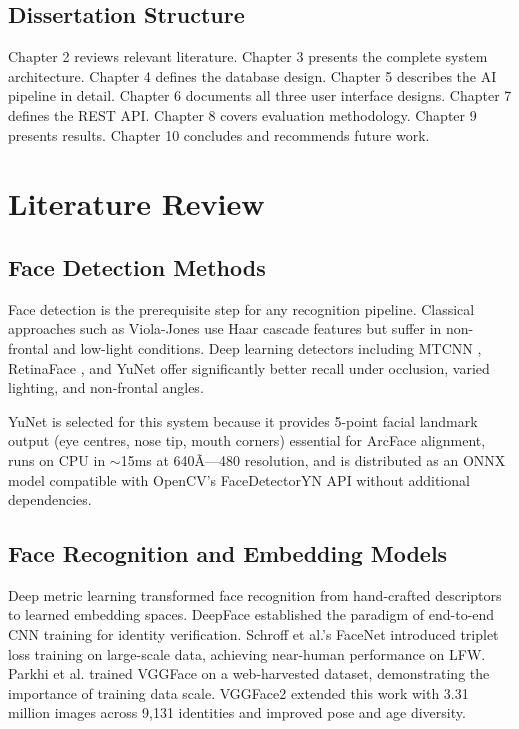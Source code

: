 \documentclass[12pt,a4paper]{report}
\begin{document}
\section{Dissertation Structure}
Chapter 2 reviews relevant literature. Chapter 3 presents the complete system architecture. Chapter 4 defines the database design. Chapter 5 describes the AI pipeline in detail. Chapter 6 documents all three user interface designs. Chapter 7 defines the REST API. Chapter 8 covers evaluation methodology. Chapter 9 presents results. Chapter 10 concludes and recommends future work.

\chapter{Literature Review}

\section{Face Detection Methods}
Face detection is the prerequisite step for any recognition pipeline. Classical approaches such as Viola-Jones \cite{viola2001rapid} use Haar cascade features but suffer in non-frontal and low-light conditions. Deep learning detectors including MTCNN \cite{zhang2016joint}, RetinaFace \cite{deng2020retinaface}, and YuNet \cite{wu2023yunet} offer significantly better recall under occlusion, varied lighting, and non-frontal angles.

YuNet is selected for this system because it provides 5-point facial landmark output (eye centres, nose tip, mouth corners) essential for ArcFace alignment, runs on CPU in $\sim$15ms at 640Ã—480 resolution, and is distributed as an ONNX model compatible with OpenCV's FaceDetectorYN API without additional dependencies.

\section{Face Recognition and Embedding Models}
Deep metric learning transformed face recognition from hand-crafted descriptors to learned embedding spaces. DeepFace \cite{sun2014deep} established the paradigm of end-to-end CNN training for identity verification. Schroff et al.'s FaceNet \cite{schroff2015facenet} introduced triplet loss training on large-scale data, achieving near-human performance on LFW. Parkhi et al. \cite{parkhi2015deep} trained VGGFace on a web-harvested dataset, demonstrating the importance of training data scale. VGGFace2 \cite{cao2018vggface2} extended this work with 3.31 million images across 9,131 identities and improved pose and age diversity.
\end{document}
